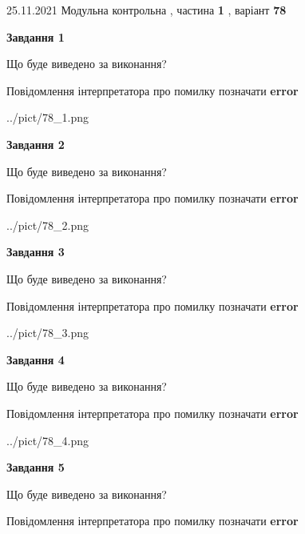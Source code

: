 \documentclass[10pt, ukrainian]{article}
\begin{document}
{25.11.2021 Модульна контрольна , частина \textbf { 1 }, варіант  \No \textbf { 78 }\par}
{
\begin {large}

{\begin {center}\textbf{Завдання 1}\end {center}}\par
Що буде виведено за виконання? \par
Повідомлення інтерпретатора про помилку позначати \textbf{error}

\begin{center}
	{../pict/78_1.png}
\end{center}
\newpage

{\begin {center}\textbf{Завдання 2}\end {center}}\par
Що буде виведено за виконання? \par
Повідомлення інтерпретатора про помилку позначати \textbf{error}

\begin{center}
	{../pict/78_2.png}
\end{center}
\newpage

{\begin {center}\textbf{Завдання 3}\end {center}}\par
Що буде виведено за виконання? \par
Повідомлення інтерпретатора про помилку позначати \textbf{error}

\begin{center}
	{../pict/78_3.png}
\end{center}
\newpage

{\begin {center}\textbf{Завдання 4}\end {center}}\par
Що буде виведено за виконання? \par
Повідомлення інтерпретатора про помилку позначати \textbf{error}

\begin{center}
	{../pict/78_4.png}
\end{center}
\newpage

{\begin {center}\textbf{Завдання 5}\end {center}}\par
Що буде виведено за виконання? \par
Повідомлення інтерпретатора про помилку позначати \textbf{error}


\end{large}}
\end{document}
